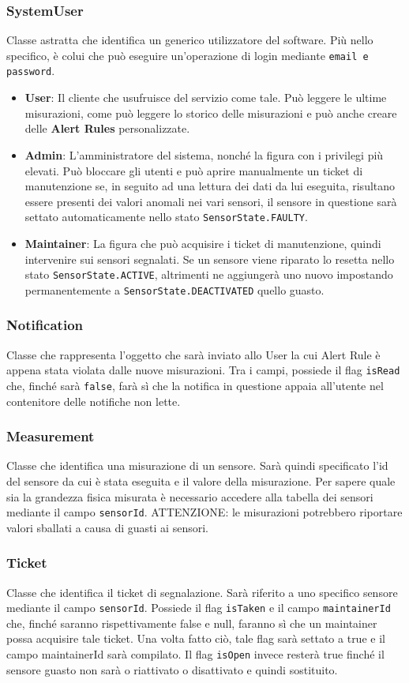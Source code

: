 \documentclass[a4paper, 11pt]{article}
\begin{document}
	\subsubsection{SystemUser}
	Classe astratta che identifica un generico utilizzatore del software. Più nello specifico, è colui che può eseguire un'operazione di login mediante \texttt{email e password}.
	\begin{itemize}
		\item \textbf{User}: Il cliente che usufruisce del servizio come tale. Può leggere le ultime misurazioni, come può leggere lo storico delle misurazioni e può anche creare delle \textbf{Alert Rules} personalizzate.
		\item \textbf{Admin}: L'amministratore del sistema, nonché la figura con i privilegi più elevati. Può bloccare gli utenti e può aprire manualmente un ticket di manutenzione se, in seguito ad una lettura dei dati da lui eseguita, risultano essere presenti dei valori anomali nei vari sensori, il sensore in questione sarà settato automaticamente nello stato \texttt{SensorState.FAULTY}.
		\item \textbf{Maintainer}: La figura che può acquisire i ticket di manutenzione, quindi intervenire sui sensori segnalati. Se un sensore viene riparato lo resetta nello stato \texttt{SensorState.ACTIVE}, altrimenti ne aggiungerà uno nuovo impostando permanentemente a \texttt{SensorState.DEACTIVATED} quello guasto.
	\end{itemize}
	\subsubsection{Notification}
	Classe che rappresenta l'oggetto che sarà inviato allo User la cui Alert Rule è appena stata violata dalle nuove misurazioni. Tra i campi, possiede il flag \texttt{isRead} che, finché sarà \texttt{false}, farà sì che la notifica in questione appaia all'utente nel contenitore delle notifiche non lette.
	\subsubsection{Measurement}
	Classe che identifica una misurazione di un sensore. Sarà quindi specificato l'id del sensore da cui è stata eseguita e il valore della misurazione. Per sapere quale sia la grandezza fisica misurata è necessario accedere alla tabella dei sensori mediante il campo \texttt{sensorId}. ATTENZIONE: le misurazioni potrebbero riportare valori sballati a causa di guasti ai sensori.
	\subsubsection{Ticket}
	Classe che identifica il ticket di segnalazione. Sarà riferito a uno specifico sensore mediante il campo \texttt{sensorId}. Possiede il flag \texttt{isTaken} e il campo \texttt{maintainerId} che, finché saranno rispettivamente false e null, faranno sì che un maintainer possa acquisire tale ticket. Una volta fatto ciò, tale flag sarà settato a true e il campo maintainerId sarà compilato. Il flag \texttt{isOpen} invece resterà true finché il sensore guasto non sarà o riattivato o disattivato e quindi sostituito.
\end{document}

